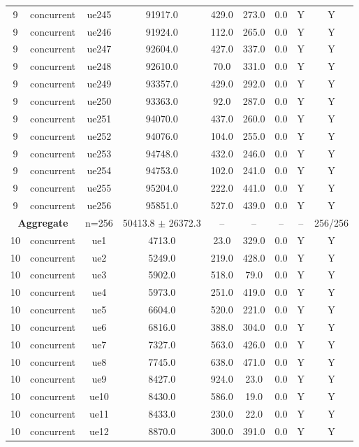 \begin{table}[ht]
\begin{tabular}{|c|c|c|c|c|c|c|c|c|}
9 & concurrent & ue245 & 91917.0 & 429.0 & 273.0 & 0.0 & Y & Y \\
9 & concurrent & ue246 & 91924.0 & 112.0 & 265.0 & 0.0 & Y & Y \\
9 & concurrent & ue247 & 92604.0 & 427.0 & 337.0 & 0.0 & Y & Y \\
9 & concurrent & ue248 & 92610.0 & 70.0 & 331.0 & 0.0 & Y & Y \\
9 & concurrent & ue249 & 93357.0 & 429.0 & 292.0 & 0.0 & Y & Y \\
9 & concurrent & ue250 & 93363.0 & 92.0 & 287.0 & 0.0 & Y & Y \\
9 & concurrent & ue251 & 94070.0 & 437.0 & 260.0 & 0.0 & Y & Y \\
9 & concurrent & ue252 & 94076.0 & 104.0 & 255.0 & 0.0 & Y & Y \\
9 & concurrent & ue253 & 94748.0 & 432.0 & 246.0 & 0.0 & Y & Y \\
9 & concurrent & ue254 & 94753.0 & 102.0 & 241.0 & 0.0 & Y & Y \\
9 & concurrent & ue255 & 95204.0 & 222.0 & 441.0 & 0.0 & Y & Y \\
9 & concurrent & ue256 & 95851.0 & 527.0 & 439.0 & 0.0 & Y & Y \\
\multicolumn{2}{|c|}{\textbf{Aggregate}} & n=256 & 50413.8 $\pm$ 26372.3 & -- & -- & -- & -- & 256/256 \\
\hline
10 & concurrent & ue1 & 4713.0 & 23.0 & 329.0 & 0.0 & Y & Y \\
10 & concurrent & ue2 & 5249.0 & 219.0 & 428.0 & 0.0 & Y & Y \\
10 & concurrent & ue3 & 5902.0 & 518.0 & 79.0 & 0.0 & Y & Y \\
10 & concurrent & ue4 & 5973.0 & 251.0 & 419.0 & 0.0 & Y & Y \\
10 & concurrent & ue5 & 6604.0 & 520.0 & 221.0 & 0.0 & Y & Y \\
10 & concurrent & ue6 & 6816.0 & 388.0 & 304.0 & 0.0 & Y & Y \\
10 & concurrent & ue7 & 7327.0 & 563.0 & 426.0 & 0.0 & Y & Y \\
10 & concurrent & ue8 & 7745.0 & 638.0 & 471.0 & 0.0 & Y & Y \\
10 & concurrent & ue9 & 8427.0 & 924.0 & 23.0 & 0.0 & Y & Y \\
10 & concurrent & ue10 & 8430.0 & 586.0 & 19.0 & 0.0 & Y & Y \\
10 & concurrent & ue11 & 8433.0 & 230.0 & 22.0 & 0.0 & Y & Y \\
10 & concurrent & ue12 & 8870.0 & 300.0 & 391.0 & 0.0 & Y & Y \\

\end{tabular}
\end{table}
